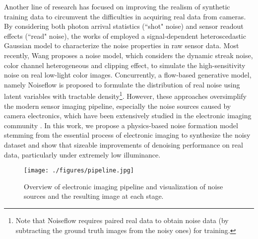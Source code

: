 \documentclass[10pt,twocolumn,letterpaper]{article}
\begin{document}
Another line of research has focused on improving the realism of synthetic
training data to circumvent the difficulties in acquiring real data from
cameras. By considering both photon arrival statistics (``shot" noise) and sensor
readout effects (``read" noise), the works of \cite{Mildenhall_2018_CVPR,Brooks2018Unprocessing} employed a signal-dependent heteroscedastic Gaussian
model \cite{Foi2008Practical} to characterize the noise properties in raw sensor
data. Most recently, Wang \etal \cite{Wang_2019_ICCV} proposes a noise model, which considers the dynamic streak noise, color channel heterogeneous and clipping effect, to simulate the high-sensitivity noise on real low-light color images.  Concurrently, a flow-based generative model, namely Noiseflow \cite{Abdelhamed_2019_ICCV} is proposed to formulate the distribution of real noise using latent variables with tractable density\footnote{Note that Noiseflow requires paired real data to obtain noise data (by subtracting the ground truth images from the noisy ones) for training.}. 
However, these approaches oversimplify the modern
sensor imaging pipeline, especially the noise sources caused by camera
electronics, which have been extensively studied in the electronic
imaging community \cite{Mikhail2014Highlevel,Healey1994Radiometric,Gow2007A,Baer2006A,El2005CMOS,Farrell2008Sensor,Irie2008A,Irie2008A2,Boie1992An,Wach2004Noise,Costantini2004Virtual}. 
In this work, we propose a
physics-based noise formation model stemming from the essential process of
electronic imaging to synthesize the noisy dataset and show that sizeable improvements of denoising
performance on real data, particularly under extremely low illuminance.



\begin{figure}[!t]
\centering
\texttt{[image: ./figures/pipeline.jpg]}
\caption{Overview of electronic imaging pipeline and visualization of noise sources and the resulting image at each stage. }
\label{fig:photosensor}
\end{figure}
\end{document}

